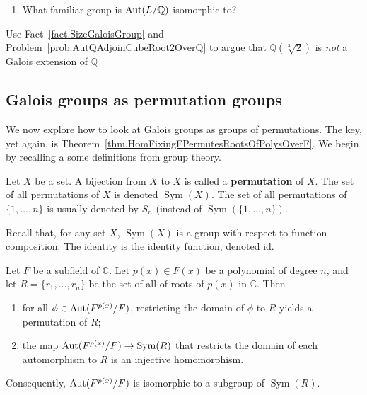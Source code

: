\begin{problem}
\begin{center}
\end{center}
\begin{enumerate}[resume]
\item What familiar group is $\operatorname{Aut}(L/\mathbb{Q})$ isomorphic to?
\end{enumerate}
\end{problem}

\begin{problem}\label{prob.QAdjoinCubeRoot2OverQNotGalois}
Use Fact~\ref{fact.SizeGaloisGroup} and Problem~\ref{prob.AutQAdjoinCubeRoot2OverQ} to argue that  $\mathbb{Q}(\sqrt[3]{2})$ is \emph{not} a Galois extension of $\mathbb{Q}$ 
\end{problem}

\subsection{Galois groups as permutation groups}
We now explore how to look at Galois groups as groups of permutations. The key, yet again, is Theorem~\ref{thm.HomFixingFPermutesRootsOfPolysOverF}. We begin by recalling a some definitions from group theory.

\begin{definition}
Let $X$ be a set. A bijection from $X$ to $X$ is called a \textbf{permutation} of $X$. The set of all permutations of $X$ is denoted $\operatorname{Sym}(X)$. 
The set of all permutations of $\{1,\ldots,n\}$ is usually denoted by $S_n$ (instead of $\operatorname{Sym}(\{1,\ldots,n\})$.
\end{definition}

Recall that, for any set $X$, $\operatorname{Sym}(X)$ is a group with respect to function composition. The identity is the identity function, denoted id.

\begin{theorem}\label{thm.GaloisGroupIsPermGroup}
Let $F$ be a subfield of $\mathbb{C}$. Let $p(x)\in F(x)$ be a polynomial of degree $n$, and let $R=\{r_1,\ldots,r_n\}$ be the set of all of roots of $p(x)$ in $\mathbb{C}$. Then 
\begin{enumerate} 
\item for all $\phi \in \operatorname{Aut}(F^{p(x)}/F)$, restricting the domain of $\phi$ to $R$ yields a permutation of $R$;
\item the map  $\operatorname{Aut}(F^{p(x)}/F)\to \operatorname{Sym}(R)$ that restricts the domain of each automorphism to $R$ is an injective homomorphism. 
\end{enumerate}
Consequently, $\operatorname{Aut}(F^{p(x)}/F)$ is isomorphic to a subgroup of $\operatorname{Sym}(R)$.
\end{theorem}

